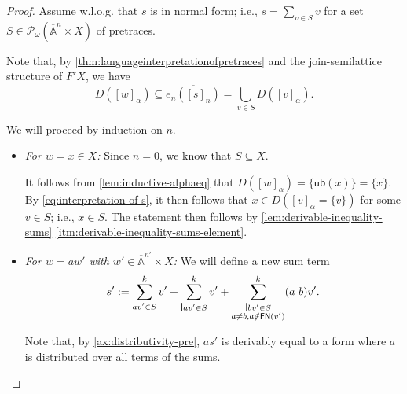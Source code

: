 \documentclass[a4paper,UKenglish,cleveref,thm-restate,numberwithinsect,final]{lipics-v2021}
\newcommand{\FN}{\mathsf{FN}}
\newcommand{\Names}{\mathbb{A}}
\newcommand{\barNames}{\overline{\Names}}
\newcommand{\pow}{\mathcal{P}}
\newcommand{\powf}{\pow_{\omega}}
\theoremstyle{plain}
\newcommand{\midmid}{\hspace{0.2ex}{\rule[-0.1ex]{0.6pt}{1.65ex}}\hspace{0.2ex}}
\newcommand{\newletter}[1]{{\midmid}#1}
\newcommand{\ub}{\mathsf{ub}}
\numberwithin{equation}{section}
\newcommand{\+}[1]{\mathcal{#1}\xspace}
\theoremstyle{definition}
\begin{document}
\begin{proof}
  Assume w.l.o.g. that \(s\) is in normal form; i.e., \(s = \sum_{v \in S} v\) for a set \(S \in \powf(\barNames^n \times X)\) of pretraces.

  Note that, by \cref{thm:languageinterpretationofpretraces} and the join-semilattice structure of \(F' X\), we have
  \begin{equation}\label{eq:interpretation-of-s}
    D([w]_\alpha) \subseteq \overline{e_n([s]_n)} = \bigcup_{v \in S} D([v]_\alpha).
  \end{equation}

  We will proceed by induction on \(n\).
  \begin{itemize}
      \item \emph{For \(w = x \in X\):}
        Since \(n = 0\), we know that \(S \subseteq X\).

        It follows from \cref{lem:inductive-alphaeq} that \(D([w]_\alpha) = \{ \ub(x) \} = \{x\}\).
        By \eqref{eq:interpretation-of-s}, it then follows that \(x \in D([v]_\alpha = \{v\})\) for some \(v \in S\); i.e., \(x \in S\).
        The statement then follows by \cref{lem:derivable-inequality-sums} \eqref{itm:derivable-inequality-sums-element}.
      \item \emph{For \(w = aw'\) with \(w' \in \barNames^{n'} \times X\):}
        We will define a new sum term
        \begin{equation*}
          s' :=
            \sum_{\substack{av' \in S}}^k v' +
            \sum_{\substack{\newletter{a}v' \in S}}^k v' +
            \sum_{\substack{\newletter{b}v' \in S \\ a \neq b, a \notin \FN(v')}}^k (a\ b)v'.
        \end{equation*}

        Note that, by \eqref{ax:distributivity-pre}, \(as'\) is derivably equal to a form where \(a\) is distributed over all terms of the sums.


\end{itemize}
\end{proof}
\end{document}
